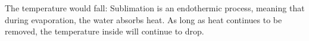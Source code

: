 The temperature would fall: Sublimation is an endothermic process, meaning that during evaporation, the water absorbs heat. As long as heat continues to be removed, the temperature inside will continue to drop.